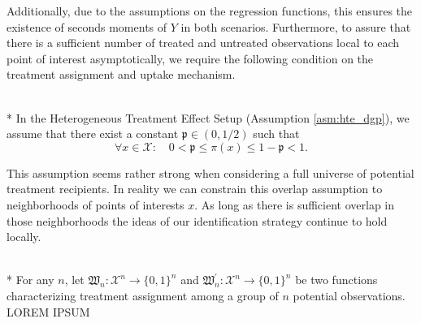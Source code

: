Additionally, due to the assumptions on the regression functions, this ensures the existence of seconds moments of $Y$ in both scenarios.
Furthermore, to assure that there is a sufficient number of treated and untreated observations local to each point of interest asymptotically, we require the following condition on the treatment assignment and uptake mechanism.
\begin{boxD}
	\begin{asm}\label{asm:treatment_overlap}\mbox{}\\*
		In the Heterogeneous Treatment Effect Setup (Assumption \ref{asm:hte_dgp}), we assume that there exist a constant $\mathfrak{p} \in (0, 1/2)$ such that
		\begin{equation}
			\forall x \in \mathcal{X}: \quad 
			0 < \mathfrak{p} \leq \pi\left(x\right) \leq 1 - \mathfrak{p} < 1.
		\end{equation}
	\end{asm}
\end{boxD}
This assumption seems rather strong when considering a full universe of potential treatment recipients.
In reality we can constrain this overlap assumption to neighborhoods of points of interests $x$.
As long as there is sufficient overlap in those neighborhoods the ideas of our identification strategy continue to hold locally.
\begin{boxD}
	\begin{asm}\label{asm:sutva}\mbox{}\\*
		For any $n$, let $\mathfrak{W}_{n}: \mathcal{X}^{n} \rightarrow \{0,1\}^{n}$ and $\mathfrak{W}_{n}^{\prime}: \mathcal{X}^{n} \rightarrow \{0,1\}^{n}$ be two functions characterizing treatment assignment among a group of $n$ potential observations.
		{\color{red} LOREM IPSUM}
	\end{asm}
\end{boxD}
